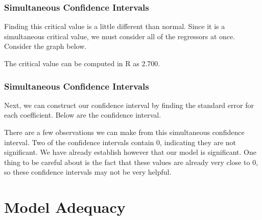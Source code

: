 \documentclass[12pt]{beamer}
\begin{document}
\begin{frame}
\frametitle{Simultaneous Confidence Intervals}
Finding this critical value is a little different than normal. Since it is a simultaneous critical value, we must consider all of the regressors at once. Consider the graph below.

\begin{center}
\end{center}
The critical value can be computed in R as 2.700.
\end{frame}

\begin{frame}
\frametitle{Simultaneous Confidence Intervals}
Next, we can construct our confidence interval by finding the standard error for each coefficient. Below are the confidence interval.
{\scriptsize
\begin{mdframed}

\end{mdframed}}

\vspace{2mm}

There are a few observations we can make from this simultaneous confidence interval. Two of the confidence intervals contain 0, indicating they are not significant. We have already establish however that our model is significant. One thing to be careful about is the fact that these values are already very close to 0, so these confidence intervals may not be very helpful.
\end{frame}

\section{Model Adequacy}
\end{document}
